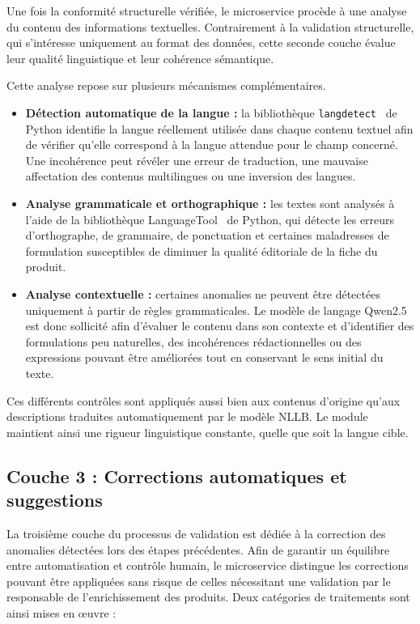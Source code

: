 Une fois la conformité structurelle vérifiée, le microservice procède à une analyse du contenu des informations textuelles. Contrairement à la validation structurelle, qui s'intéresse uniquement au format des données, cette seconde couche évalue leur qualité linguistique et leur cohérence sémantique.

Cette analyse repose sur plusieurs mécanismes complémentaires.

\begin{itemize}
    \item \textbf{Détection automatique de la langue :} la bibliothèque \texttt{langdetect}~\cite{langdetect} de Python identifie la langue réellement utilisée dans chaque contenu textuel afin de vérifier qu'elle correspond à la langue attendue pour le champ concerné. Une incohérence peut révéler une erreur de traduction, une mauvaise affectation des contenus multilingues ou une inversion des langues.

    \item \textbf{Analyse grammaticale et orthographique :} les textes sont analysés à l'aide de la bibliothèque LanguageTool~\cite{languagetool} de Python, qui détecte les erreurs d'orthographe, de grammaire, de ponctuation et certaines maladresses de formulation susceptibles de diminuer la qualité éditoriale de la fiche du produit.

    \item \textbf{Analyse contextuelle :} certaines anomalies ne peuvent être détectées uniquement à partir de règles grammaticales. Le modèle de langage Qwen2.5~\cite{llm_models} est donc sollicité afin d'évaluer le contenu dans son contexte et d'identifier des formulations peu naturelles, des incohérences rédactionnelles ou des expressions pouvant être améliorées tout en conservant le sens initial du texte.
\end{itemize}

Ces différents contrôles sont appliqués aussi bien aux contenus d'origine qu'aux descriptions traduites automatiquement par le modèle NLLB. Le module maintient ainsi une rigueur linguistique constante, quelle que soit la langue cible.
\newpage
\subsection{Couche 3 : Corrections automatiques et suggestions}

La troisième couche du processus de validation est dédiée à la correction des anomalies détectées lors des étapes précédentes. Afin de garantir un équilibre entre automatisation et contrôle humain, le microservice distingue les corrections pouvant être appliquées sans risque de celles nécessitant une validation par le responsable de l'enrichissement des produits. Deux catégories de traitements sont ainsi mises en œuvre :

